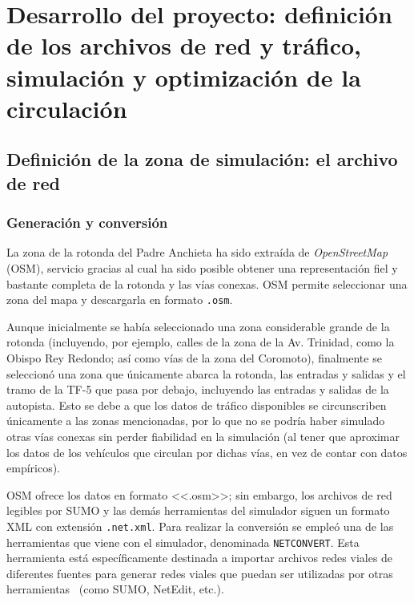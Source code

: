 \chapter{Desarrollo del proyecto: definición de los archivos de red y tráfico, simulación y optimización de la circulación}
\label{cap:3-desarrollo}

\section{Definición de la zona de simulación: el archivo de red}
\label{def_zona_sim_archivo_red}

\subsection{Generación y conversión}
\label{gen_conv}

La zona de la rotonda del Padre Anchieta ha sido extraída de \textit{OpenStreetMap} (OSM), servicio gracias al cual ha sido posible obtener una representación fiel y bastante completa de la rotonda y las vías conexas. OSM permite seleccionar una zona del mapa y descargarla en formato \texttt{.osm}.

Aunque inicialmente se había seleccionado una zona considerable grande de la rotonda (incluyendo, por ejemplo, calles de la zona de la Av. Trinidad, como la Obispo Rey Redondo; así como vías de la zona del Coromoto), finalmente se seleccionó una zona que únicamente abarca la rotonda, las entradas y salidas y el tramo de la TF-5 que pasa por debajo, incluyendo las entradas y salidas de la autopista. Esto se debe a que los datos de tráfico disponibles se circunscriben únicamente a las zonas mencionadas, por lo que no se podría haber simulado otras vías conexas sin perder fiabilidad en la simulación (al tener que aproximar los datos de los vehículos que circulan por dichas vías, en vez de contar con datos empíricos).

OSM ofrece los datos en formato <<.osm>>; sin embargo, los archivos de red legibles por SUMO y las demás herramientas del simulador siguen un formato XML con extensión \texttt{.net.xml}. Para realizar la conversión se empleó una de las herramientas que viene con el simulador, denominada \texttt{NETCONVERT}. Esta herramienta está específicamente destinada a importar archivos redes viales de diferentes fuentes para generar redes viales que puedan ser utilizadas por otras herramientas~\cite{noauthor_netconvert_nodate} (como SUMO, NetEdit, etc.).

